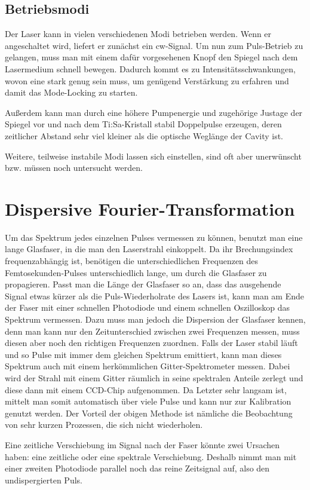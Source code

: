 \documentclass[bachelor,       %
               twoside,        %
               BCOR10mm,       %
               english,ngerman, %
               ]{GAUBM}
\begin{document}
\subsection{Betriebsmodi}
Der Laser kann in vielen verschiedenen Modi betrieben werden.
Wenn er angeschaltet wird, liefert er zunächst ein cw-Signal.
Um nun zum Puls-Betrieb zu gelangen, muss man mit einem dafür vorgesehenen Knopf den Spiegel nach dem Lasermedium schnell bewegen.
Dadurch kommt es zu Intensitätsschwankungen, wovon eine stark genug sein muss, um genügend Verstärkung zu erfahren und damit das Mode-Locking zu starten.

Außerdem kann man durch eine höhere Pumpenergie und zugehörige Justage der Spiegel vor und nach dem Ti:Sa-Kristall stabil Doppelpulse erzeugen, deren zeitlicher Abstand sehr viel kleiner als die optische Weglänge der Cavity ist.

Weitere, teilweise instabile Modi lassen sich einstellen, sind oft aber unerwünscht bzw. müssen noch untersucht werden.


\section{Dispersive Fourier-Transformation}
Um das Spektrum jedes einzelnen Pulses vermessen zu können, benutzt man eine lange Glasfaser, in die man den Laserstrahl einkoppelt.
Da ihr Brechungsindex frequenzabhängig ist, benötigen die unterschiedlichen Frequenzen des Femtosekunden-Pulses unterschiedlich lange, um durch die Glasfaser zu propagieren.
Passt man die Länge der Glasfaser so an, dass das ausgehende Signal etwas kürzer als die Puls-Wiederholrate des Lasers ist, kann man am Ende der Faser mit einer schnellen Photodiode und einem schnellen Oszilloskop das Spektrum vermessen.
Dazu muss man jedoch die Dispersion der Glasfaser kennen, denn man kann nur den Zeitunterschied zwischen zwei Frequenzen messen, muss diesen aber noch den richtigen Frequenzen zuordnen.
Falls der Laser stabil läuft und so Pulse mit immer dem gleichen Spektrum emittiert, kann man dieses Spektrum auch mit einem herkömmlichen Gitter-Spektrometer messen.
Dabei wird der Strahl mit einem Gitter räumlich in seine spektralen Anteile zerlegt und diese dann mit einem CCD-Chip aufgenommen.
Da Letzter sehr langsam ist, mittelt man somit automatisch über viele Pulse und kann nur zur Kalibration genutzt werden.
Der Vorteil der obigen Methode ist nämliche die Beobachtung von sehr kurzen Prozessen, die sich nicht wiederholen.

Eine zeitliche Verschiebung im Signal nach der Faser könnte zwei Ursachen haben: eine zeitliche oder eine spektrale Verschiebung.
Deshalb nimmt man mit einer zweiten Photodiode parallel noch das reine Zeitsignal auf, also den undispergierten Puls.
\end{document}
